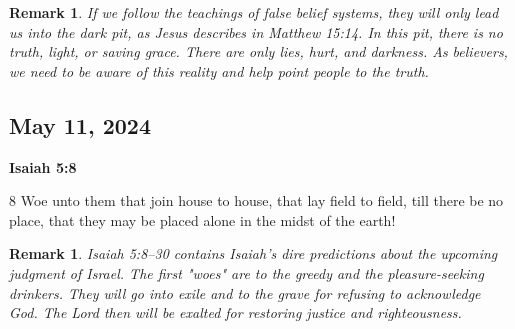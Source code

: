 \documentclass{article}
\newtheorem{remark}[theorem]{Remark}
\begin{document}
\begin{remark}
If we follow the teachings of false belief systems, they will only lead us
into the dark pit, as Jesus describes in Matthew 15:14. In this pit, there
is no truth, light, or saving grace. There are only lies, hurt, and
darkness. As believers, we need to be aware of this reality and help point
people to the truth. 
\end{remark}

\bigskip 

\subsection{May 11, 2024}

\textbf{Isaiah 5:8}

$8$ Woe unto them that join house to house, that lay field to field, till
there be no place, that they may be placed alone in the midst of the earth! 

\begin{remark}
Isaiah 5:8--30 contains Isaiah's dire predictions about the upcoming
judgment of Israel. The first "woes" are to the greedy and the
pleasure-seeking drinkers. They will go into exile and to the grave for
refusing to acknowledge God. The Lord then will be exalted for restoring
justice and righteousness.
\end{remark}
\end{document}
